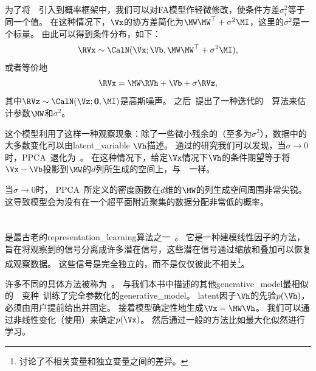 为了将~~引入到概率框架中，我们可以对\gls{FA}模型作轻微修改，使条件方差$\sigma_i^2$等于同一个值。
在这种情况下，$\Vx$的协方差简化为$\MW\MW^{\top}+\sigma^2\MI$，这里的$\sigma^2$是一个标量。
由此可以得到条件分布，如下：
\begin{align}
\label{eqn:135}
\RVx \sim \CalN(\Vx; \Vb, \MW\MW^{\top} + \sigma^2\MI ),
\end{align}
或者等价地
\begin{align}
\label{eqn:136}
\RVx = \MW\RVh + \Vb + \sigma\RVz,
\end{align}
其中$\RVz \sim \CalN(\Vz;\mathbf{0},\MI)$是高斯噪声。
之后~\citet{tipping99mixtures}提出了一种迭代的~~算法来估计参数$\MW$和$\sigma^2$。


这个模型利用了这样一种观察现象：除了一些微小残余的（至多为$\sigma^2$），数据中的大多数变化可以由\gls{latent_variable} $\Vh$描述。
通过\citet{tipping99mixtures}的研究我们可以发现，当$\sigma \xrightarrow{} 0$时，\gls{PPCA}~退化为~。
在这种情况下，给定$\Vx$情况下$\Vh$的条件期望等于将$\Vx - \Vb$投影到$\MW$的$d$列所生成的空间上，与~~一样。

当$\sigma\xrightarrow{} 0$时， \gls{PPCA}~所定义的密度函数在$d$维的$\MW$的列生成空间周围非常尖锐。
这导致模型会为没有在一个超平面附近聚集的数据分配非常低的概率。

\section{}
\label{sec:independent_component_analysis_ica}


是最古老的\gls{representation_learning}算法之一~\citep{Herault+Ans-1984,Jutten+Herault-91,Comon94,Hyvarinen-1999,Hyvarinen-2001,Hinton-ICA-2001,Teh-2003}。
它是一种建模线性因子的方法，旨在将观察到的信号分离成许多潜在信号，这些潜在信号通过缩放和叠加可以恢复成观察数据。
这些信号是完全独立的，而不是仅仅彼此不相关\footnote{讨论了不相关变量和独立变量之间的差异。}。


许多不同的具体方法被称为~。
与我们本书中描述的其他\gls{generative_model}最相似的~~变种~\citep{Pham-et-al-1992}训练了完全参数化的\gls{generative_model}。
\gls{latent}因子$\Vh$的先验$p(\Vh)$，必须由用户提前给出并固定。
接着模型确定性地生成$\Vx = \MW \Vh$。
我们可以通过非线性变化（使用）来确定$p(\Vx)$。
然后通过一般的方法比如最大化似然进行学习。



